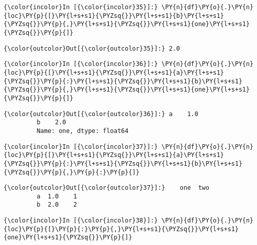     \begin{Verbatim}[commandchars=\\\{\}]
{\color{incolor}In [{\color{incolor}35}]:} \PY{n}{df}\PY{o}{.}\PY{n}{loc}\PY{p}{[}\PY{l+s+s1}{\PYZsq{}}\PY{l+s+s1}{b}\PY{l+s+s1}{\PYZsq{}}\PY{p}{,}\PY{l+s+s1}{\PYZsq{}}\PY{l+s+s1}{one}\PY{l+s+s1}{\PYZsq{}}\PY{p}{]}
\end{Verbatim}

            \begin{Verbatim}[commandchars=\\\{\}]
{\color{outcolor}Out[{\color{outcolor}35}]:} 2.0
\end{Verbatim}
        
    \begin{Verbatim}[commandchars=\\\{\}]
{\color{incolor}In [{\color{incolor}36}]:} \PY{n}{df}\PY{o}{.}\PY{n}{loc}\PY{p}{[}\PY{l+s+s1}{\PYZsq{}}\PY{l+s+s1}{a}\PY{l+s+s1}{\PYZsq{}}\PY{p}{:}\PY{l+s+s1}{\PYZsq{}}\PY{l+s+s1}{b}\PY{l+s+s1}{\PYZsq{}}\PY{p}{,}\PY{l+s+s1}{\PYZsq{}}\PY{l+s+s1}{one}\PY{l+s+s1}{\PYZsq{}}\PY{p}{]}
\end{Verbatim}

            \begin{Verbatim}[commandchars=\\\{\}]
{\color{outcolor}Out[{\color{outcolor}36}]:} a    1.0
         b    2.0
         Name: one, dtype: float64
\end{Verbatim}
        
    \begin{Verbatim}[commandchars=\\\{\}]
{\color{incolor}In [{\color{incolor}37}]:} \PY{n}{df}\PY{o}{.}\PY{n}{loc}\PY{p}{[}\PY{l+s+s1}{\PYZsq{}}\PY{l+s+s1}{a}\PY{l+s+s1}{\PYZsq{}}\PY{p}{:}\PY{l+s+s1}{\PYZsq{}}\PY{l+s+s1}{b}\PY{l+s+s1}{\PYZsq{}}\PY{p}{,}\PY{p}{:}\PY{p}{]}
\end{Verbatim}

            \begin{Verbatim}[commandchars=\\\{\}]
{\color{outcolor}Out[{\color{outcolor}37}]:}    one  two
         a  1.0    1
         b  2.0    2
\end{Verbatim}
        
    \begin{Verbatim}[commandchars=\\\{\}]
{\color{incolor}In [{\color{incolor}38}]:} \PY{n}{df}\PY{o}{.}\PY{n}{loc}\PY{p}{[}\PY{p}{:}\PY{p}{,}\PY{l+s+s1}{\PYZsq{}}\PY{l+s+s1}{one}\PY{l+s+s1}{\PYZsq{}}\PY{p}{]}
\end{Verbatim}

